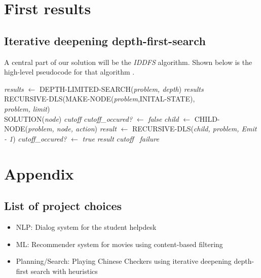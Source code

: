 \documentclass[a4paper,11pt]{report}
\begin{document}
\chapter{First results}
\section{Iterative deepening depth-first-search}
A central part of our solution will be the \emph{IDDFS} algorithm.
Shown below is the 
high-level pseudocode for that algorithm \cite{aimodern}.\\
\begin{algorithmic}
\State \emph{results} $\gets$ DEPTH-LIMITED-SEARCH(\emph{problem, depth})
\State \Return \emph{results}
\EndIf
\EndFor
\EndFunction
\\
\State \Return RECURSIVE-DLS(MAKE-NODE(\emph{problem},INITAL-STATE), \\
\hspace{50mm} \emph{problem, limit})
\EndFunction
\\
\State \Return SOLUTION(\emph{node})
\State \Return \emph{cutoff}
\Else
\State \emph{cutoff\_occured?} $\gets$ \emph{false}
\State \emph{child} $\gets$ CHILD-NODE(\emph{problem, node, action})
\State \emph{result} $\gets$ RECURSIVE-DLS(\emph{child, problem, Emit - 1})
\State \emph{cutoff\_occured?} $\gets$ \emph{true}
\State \Return \emph{result}
\EndIf
\EndFor
{}
\Return \emph{cutoff}
\Else
\ \Return \emph{failure}
\EndIf
\EndIf
\EndFunction
\end{algorithmic}


\chapter{Appendix}
\section{List of project choices}
\begin{itemize}
\item NLP: Dialog system for the student helpdesk 
\item ML: Recommender system for movies using content-based filtering
\item Planning/Search: Playing Chinese Checkers using iterative deepening depth-first search with heuristics
\end{itemize}






\end{document}
